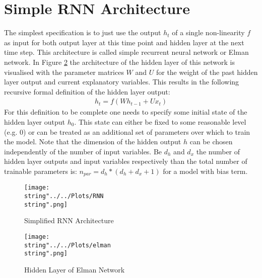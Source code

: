 \section{Simple RNN Architecture}
The simplest specification is to just use the output $h_t$ of a single non-linearity $f$  as input for both output layer at this time point and hidden layer at the next time step. This architecture is called simple recurrent neural network or Elman network. In Figure \ref{fig:elman} the architecture of the hidden layer of this network is visualised with the parameter matrices $W$ and $U$ for the weight of the past hidden layer output and current explanatory variables. This results in the following recursive formal definition of the hidden layer output:
\begin{align*}
h_t = f(Wh_{t-1} + Ux_t)
\end{align*}
For this definition to be complete one needs to specify some initial state of the hidden layer output $h_0$. This state can either be fixed to some reasonable level (e.g. 0) or can be treated as an additional set of parameters over which to train the model.
Note that the dimension of the hidden output $h$ can be chosen independently of the number of input variables. Be $d_h$ and $d_x$ the number of hidden layer outputs and input variables respectively than the total number of trainable parameters is: $n_{par} = d_h * (d_h + d_x + 1)$ for a model with bias term.

\begin{figure}
  \centering
\texttt{[image: \\string"../../Plots/RNN\\string".png]}
  \caption{Simplified RNN Architecture}\label{fig:RNN}
\end{figure}

\begin{figure}
  \centering
\texttt{[image: \\string"../../Plots/elman\\string".png]}
  \caption{Hidden Layer of Elman Network}\label{fig:elman}
\end{figure}

